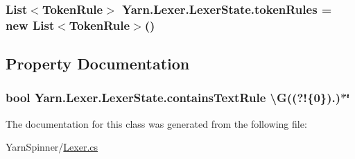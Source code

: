 \hypertarget{a00100_adf6563b1dc6f3ef80ed13c2b15b7be03}{
\subsubsection[{token\-Rules}]{\setlength{\rightskip}{0pt plus 5cm}List$<${\bf Token\-Rule}$>$ Yarn.\-Lexer.\-Lexer\-State.\-token\-Rules = new List$<${\bf Token\-Rule}$>$()}}\label{a00100_adf6563b1dc6f3ef80ed13c2b15b7be03}


\subsection{Property Documentation}
\hypertarget{a00100_a69948f05c35eeae9cb8448c849a053e6}{
\subsubsection[{contains\-Text\-Rule}]{\setlength{\rightskip}{0pt plus 5cm}bool Yarn.\-Lexer.\-Lexer\-State.\-contains\-Text\-Rule \textbackslash{}G((?!\{0\}).)$\ast$\char`\"{}\hspace{0.3cm}{\ttfamily [get]}}}\label{a00100_a69948f05c35eeae9cb8448c849a053e6}


The documentation for this class was generated from the following file\-:\begin{DoxyCompactItemize}
\item 
Yarn\-Spinner/\hyperlink{a00263}{Lexer.\-cs}\end{DoxyCompactItemize}
